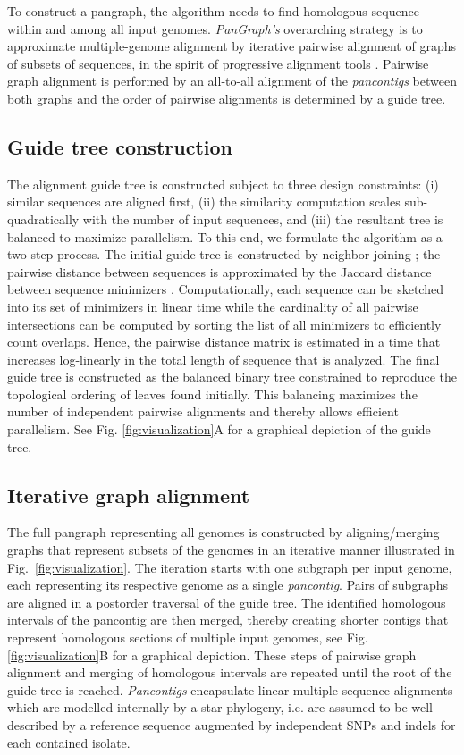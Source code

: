 \documentclass[aps,rmp,reprint,superscriptaddress,notitlepage,10pt]{revtex4-1}
\begin{document}
To construct a pangraph, the algorithm needs to find homologous sequence within and among all input genomes.
\emph{PanGraph's} overarching strategy is to approximate multiple-genome alignment by iterative pairwise alignment of graphs of subsets of sequences, in the spirit of progressive alignment tools \cite{feng1987progressive,darling2010progressivemauve,armstrong2020progressive}.
Pairwise graph alignment is performed by an all-to-all alignment of the \emph{pancontigs} between both graphs and the order of pairwise alignments is determined by a guide tree.

\subsection{Guide tree construction}
The alignment guide tree is constructed subject to three design constraints: (i) similar sequences are aligned first, (ii) the similarity computation scales sub-quadratically with the number of input sequences, and (iii) the resultant tree is balanced to maximize parallelism.
To this end, we formulate the algorithm as a two step process.
The initial guide tree is constructed by neighbor-joining \cite{saitou1987neighbor}; the pairwise distance between sequences is approximated by the Jaccard distance between sequence minimizers \cite{roberts2004reducing}.
Computationally, each sequence can be sketched into its set of minimizers in linear time while the cardinality of all pairwise intersections can be computed by sorting the list of all minimizers to efficiently count overlaps.
Hence, the pairwise distance matrix is estimated in a time that increases log-linearly in the total length of sequence that is analyzed.
The final guide tree is constructed as the balanced binary tree constrained to reproduce the topological ordering of leaves found initially.
This balancing maximizes the number of independent pairwise alignments and thereby allows efficient parallelism.
See Fig. \ref{fig:visualization}A for a graphical depiction of the guide tree.

\subsection{Iterative graph alignment}
The full pangraph representing all genomes is constructed by aligning/merging graphs that represent subsets of the genomes in an iterative manner illustrated in Fig.~\ref{fig:visualization}.
The iteration starts with one subgraph per input genome, each representing its respective genome as a single \emph{pancontig}.
Pairs of subgraphs are aligned in a postorder traversal of the guide tree.
The identified homologous intervals of the pancontig are then merged, thereby creating shorter contigs that represent homologous sections of multiple input genomes, see Fig. \ref{fig:visualization}B for a graphical depiction.
These steps of pairwise graph alignment and merging of homologous intervals are repeated until the root of the guide tree is reached.
\emph{Pancontigs} encapsulate linear multiple-sequence alignments which are modelled internally by a star phylogeny, i.e. are assumed to be well-described by a reference sequence augmented by independent SNPs and indels for each contained isolate.
\end{document}
